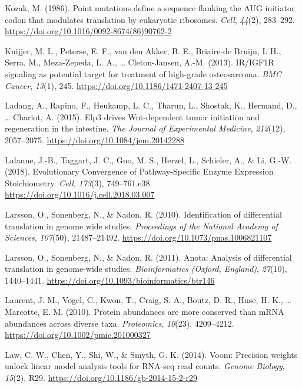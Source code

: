 \documentclass[12pt,openany]{book}
\begin{document}
\hypertarget{ref-Kozak1986}{}
Kozak, M. (1986). Point mutations define a sequence flanking the AUG
initiator codon that modulates translation by eukaryotic ribosomes.
\emph{Cell}, \emph{44}(2), 283--292.
\url{https://doi.org/10.1016/0092-8674(86)90762-2}

\hypertarget{ref-Kuijjer2013}{}
Kuijjer, M. L., Peterse, E. F., van den Akker, B. E., Briaire-de Bruijn,
I. H., Serra, M., Meza-Zepeda, L. A., \ldots{} Cleton-Jansen, A.-M.
(2013). IR/IGF1R signaling as potential target for treatment of
high-grade osteosarcoma. \emph{BMC Cancer}, \emph{13}(1), 245.
\url{https://doi.org/10.1186/1471-2407-13-245}

\hypertarget{ref-Ladang2015}{}
Ladang, A., Rapino, F., Heukamp, L. C., Tharun, L., Shostak, K.,
Hermand, D., \ldots{} Chariot, A. (2015). Elp3 drives Wnt-dependent
tumor initiation and regeneration in the intestine. \emph{The Journal of
Experimental Medicine}, \emph{212}(12), 2057--2075.
\url{https://doi.org/10.1084/jem.20142288}

\hypertarget{ref-Lalanne2018}{}
Lalanne, J.-B., Taggart, J. C., Guo, M. S., Herzel, L., Schieler, A., \&
Li, G.-W. (2018). Evolutionary Convergence of Pathway-Specific Enzyme
Expression Stoichiometry. \emph{Cell}, \emph{173}(3), 749--761.e38.
\url{https://doi.org/10.1016/j.cell.2018.03.007}

\hypertarget{ref-Larsson2010}{}
Larsson, O., Sonenberg, N., \& Nadon, R. (2010). Identification of
differential translation in genome wide studies. \emph{Proceedings of
the National Academy of Sciences}, \emph{107}(50), 21487--21492.
\url{https://doi.org/10.1073/pnas.1006821107}

\hypertarget{ref-Larsson2011}{}
Larsson, O., Sonenberg, N., \& Nadon, R. (2011). Anota: Analysis of
differential translation in genome-wide studies. \emph{Bioinformatics
(Oxford, England)}, \emph{27}(10), 1440--1441.
\url{https://doi.org/10.1093/bioinformatics/btr146}

\hypertarget{ref-Laurent2010}{}
Laurent, J. M., Vogel, C., Kwon, T., Craig, S. A., Boutz, D. R., Huse,
H. K., \ldots{} Marcotte, E. M. (2010). Protein abundances are more
conserved than mRNA abundances across diverse taxa. \emph{Proteomics},
\emph{10}(23), 4209--4212. \url{https://doi.org/10.1002/pmic.201000327}

\hypertarget{ref-Law2014}{}
Law, C. W., Chen, Y., Shi, W., \& Smyth, G. K. (2014). Voom: Precision
weights unlock linear model analysis tools for RNA-seq read counts.
\emph{Genome Biology}, \emph{15}(2), R29.
\url{https://doi.org/10.1186/gb-2014-15-2-r29}
\end{document}
